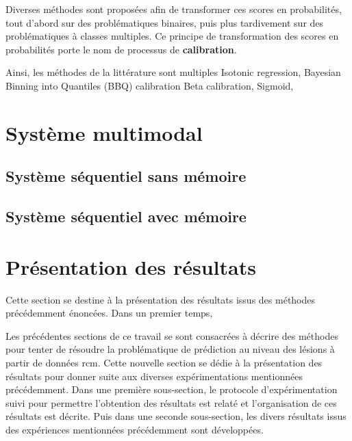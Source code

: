 Diverses méthodes sont proposées afin de transformer ces scores en probabilités, tout d'abord sur des problématiques binaires, puis plus tardivement sur des problématiques à classes multiples. Ce principe de transformation des scores en probabilités porte le nom de processus de \textbf{calibration}.\par

Ainsi, les méthodes de la littérature sont multiples
Isotonic regression, \cite{Zadrozny2002}
Bayesian Binning into Quantiles (BBQ) calibration\cite{Naeini2015}
Beta calibration,\cite{Kull2017}
Sigmoid,\cite{kull2017b}

\section{Système multimodal}
\subsection{Système séquentiel sans mémoire}
\subsection{Système séquentiel avec mémoire}

\section{Présentation des résultats}
Cette section se destine à la présentation des résultats issus des méthodes précédemment énoncées. Dans un premier temps, 

Les précédentes sections de ce travail se sont consacrées à décrire des méthodes pour tenter de résoudre la problématique de prédiction au niveau des lésions à partir de données \gls{rcm}. Cette nouvelle section se dédie à la présentation des résultats pour donner suite aux diverses expérimentations mentionnées précédemment. Dans une première sous-section, le protocole d'expérimentation suivi pour permettre l'obtention des résultats est relaté et l'organisation de ces résultats est décrite. Puis dans une seconde sous-section, les divers résultats issus des expériences mentionnées précédemment sont développées.\par

